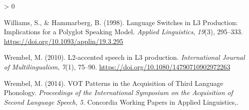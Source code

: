 \documentclass[
  english,
  man]{apa6}
\newlength{\cslhangindent}
\newenvironment{CSLReferences}[2] %
 {%
  \setlength{\parindent}{0pt}
  \ifodd #1 \everypar{\setlength{\hangindent}{\cslhangindent}}\ignorespaces\fi
  \ifnum #2 > 0
  \setlength{\parskip}{#2\baselineskip}
  \fi
 }%
 {}
\begin{document}
\begin{CSLReferences}{1}{0}
\leavevmode\hypertarget{ref-williams_language_1998}{}%
Williams, S., \& Hammarberg, B. (1998). Language {Switches} in {L3} {Production}: {Implications} for a {Polyglot} {Speaking} {Model}. \emph{Applied Linguistics}, \emph{19}(3), 295--333. \url{https://doi.org/10.1093/applin/19.3.295}

\leavevmode\hypertarget{ref-wrembel_l2-accented_2010}{}%
Wrembel, M. (2010). L2-accented speech in {L3} production. \emph{International Journal of Multilingualism}, \emph{7}(1), 75--90. \url{https://doi.org/10.1080/14790710902972263}

\leavevmode\hypertarget{ref-wrembel_vot_2014}{}%
Wrembel, M. (2014). {VOT} {Patterns} in the {Acquisition} of {Third} {Language} {Phonology}. \emph{Proceedings of the {International} {Symposium} on the {Acquisition} of {Second} {Language} {Speech}}, \emph{5}. Concordia Working Papers in Applied Linguistics,.

\end{CSLReferences}

\endgroup
\end{document}
